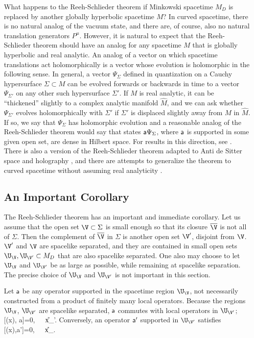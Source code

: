 \documentclass[12pt]{article}
\def\a{{\sf a}}
\def\bar{\overline}
\def\hat{\widehat}
\numberwithin{equation}{section}
\def\bar{\overline}
\def\bar{\overline}
\begin{document}
What happens to the Reeh-Schlieder theorem if Minkowski spacetime $M_D$ is replaced by another globally hyperbolic spacetime $M$?
In curved spacetime, there is no natural analog of the vacuum state, and there are, of course, also no natural translation 
generators $P^\mu$.   However, it is natural to expect that the Reeh-Schlieder theorem should have an analog for any spacetime $M$
that is globally hyperbolic and real analytic.   An analog of a vector on which spacetime translations
act holomorphically is  a vector whose evolution is holomorphic in the following sense.  
In general, a vector $\Psi_\Sigma$ defined in quantization
on a Cauchy  hypersurface $\Sigma\subset M$ can be evolved forwards or backwards in time to a vector $\Psi_{\Sigma'}$ on
any other such hypersurface $\Sigma'$.  If $M$ is real analytic, it can be ``thickened'' slightly to a complex analytic manifold
$\hat M$, and we can ask whether $\Psi_{\Sigma'}$ evolves holomorphically with $\Sigma'$ if $\Sigma'$ is displaced slightly
away from $M$ in $\hat M$.  If so, we say that $\Psi_\Sigma$ has holomorphic evolution and a reasonable analog
of the Reeh-Schlieder theorem would say  that states $\a\Psi_\Sigma$,
where $\a$ is supported in some given open set, are dense in Hilbert space.  For results in this direction, see \cite{SVW,GW}.  There is
also a version of the Reeh-Schlieder theorem adapted to Anti de Sitter space and holography \cite{morrison}, and
there are attempts to generalize the theorem to curved spacetime without assuming real analyticity
\cite{KS}.



\subsection{An Important Corollary}\label{corollary}

The Reeh-Schlieder theorem has an important and immediate corollary.   Let us assume that the open set $\V\subset \Sigma$
is small enough so that its closure $\bar\V$ is not all of $\Sigma$.  Then the complement of $\bar \V$ in $\Sigma$ is another open set $\V'$,
disjoint from $\V$.  $\V'$ and $\V$ are spacelike separated, and they are contained in  small open sets $\U_\V, \U_{\V'}\subset M_D$ that
are also spacelike separated.  One also may choose to let $\U_\V$ and $\U_{\V'}$ be as large as possible, while remaining at
spacelike separation.  The precise choice of $\U_\V$ and $\U_{\V'}$ is not important in this section.

Let $\a$ be any operator
supported in the spacetime region $\U_\V$, not necessarily constructed from a product of finitely many local operators.
Because the regions $\U_\V$, $\U_{\V'}$ are spacelike separated, $\a$ commutes with local operators in $\U_{\V'}$;
\be\label{reddo} [\phi(x), \a]=0,~~~x\in \U_{\V'}.\ee
 Conversely, an operator
$\a'$ supported in $\U_{\V'}$ satisfies
\be\label{eddo}[\phi(x),\a']=0,~~~x\in\U_\V.\ee  
\end{document}
